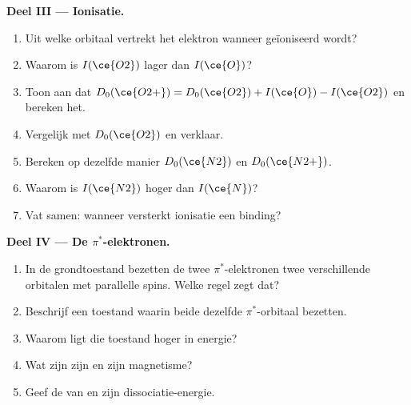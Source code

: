 \begin{problem}
\medskip
\noindent\textbf{Deel III --- Ionisatie.}
\begin{enumerate}[resume]
  \item Uit welke orbitaal vertrekt het elektron wanneer  geïoniseerd wordt?
  \item Waarom is $I(\ce{O2})$ lager dan $I(\ce{O})$?
  \item Toon aan dat $D_0(\ce{O2+}) = D_0(\ce{O2}) + I(\ce{O}) - I(\ce{O2})$ en bereken het.
  \item Vergelijk met $D_0(\ce{O2})$ en verklaar.
  \item Bereken op dezelfde manier $D_0(\ce{N2})$ en $D_0(\ce{N2+})$.
  \item Waarom is $I(\ce{N2})$ hoger dan $I(\ce{N})$?
  \item Vat samen: wanneer versterkt ionisatie een binding?
\end{enumerate}

\medskip
\noindent\textbf{Deel IV --- De $\pi^*$-elektronen.}
\begin{enumerate}[resume]
  \item In de grondtoestand bezetten de twee $\pi^*$-elektronen twee verschillende orbitalen met
        parallelle spins. Welke regel zegt dat?
  \item Beschrijf een toestand waarin beide dezelfde $\pi^*$-orbitaal bezetten.
  \item Waarom ligt die toestand hoger in energie?
  \item Wat zijn zijn  en zijn magnetisme?
  \item Geef de  van  en zijn dissociatie-energie.
\end{enumerate}
\end{problem}
